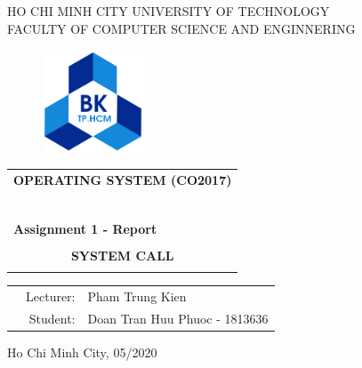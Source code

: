 \documentclass[a4paper]{article}
\begin{document}
\begin{titlepage}
\begin{center}
\Large{HO CHI MINH CITY UNIVERSITY OF TECHNOLOGY \\
FACULTY OF COMPUTER SCIENCE AND ENGINNERING}
\end{center}

\vspace{1cm}

\begin{figure}[h!]
\begin{center}
\includegraphics[width=3cm]{hcmut.png}
\end{center}
\end{figure}

\vspace{1cm}


\begin{center}
\begin{tabular}{c}
\multicolumn{1}{l}{\textbf{{\Large OPERATING SYSTEM (CO2017)}}}\\
~~\\
\hline
\\
\multicolumn{1}{l}{\textbf{{\Large Assignment 1 - Report}}}\\
\\
\textbf{{\Huge SYSTEM CALL}}\\
\\
\hline
\end{tabular}
\end{center}

\vspace{3cm}

\begin{table}[h]
\begin{tabular}{rrl}
\hspace{5 cm} & Lecturer: & Pham Trung Kien\\
& Student: & Doan Tran Huu Phuoc - 1813636 \\
\end{tabular}
\end{table}

\begin{center}
{\footnotesize Ho Chi Minh City, 05/2020}
\end{center}
\end{titlepage}
\end{document}
